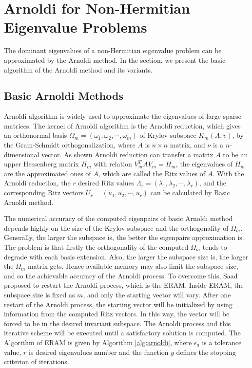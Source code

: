 \section{Arnoldi for Non-Hermitian Eigenvalue Problems}

The dominant eigenvalues of a non-Hermitian eigenvalue problem can be approximated by the Arnoldi method. In the section, we present the basic algorithm of the Arnoldi method and its variants.

\subsection{Basic Arnoldi Methods}
Arnoldi algorithm \cite{arnoldi1951principle} is widely used to approximate the eigenvalues of large sparse matrices. The kernel of Arnoldi algorithm is the Arnoldi reduction, which gives an orthonormal basis \(\Omega_m = (\omega_1,\omega_2,\cdots,\omega_m)\) of Krylov subspace \(K_m(A,v)\), by the Gram-Schmidt orthogonalization, where \(A\) is  \(n \times n\) matrix, and $\nu$ is a \(n\)-dimensional vector. As shown Arnoldi reduction can transfer a matrix \(A\) to be an upper Hessenberg matrix \(H_m\) with relation $V_m^T A V_m = H_m$, the eigenvalues of \(H_m\) are the approximated ones of \(A\), which are called the Ritz values of \(A\). With the Arnoldi reduction, the $r$ desired Ritz values $\Lambda_r=(\lambda_1,\lambda_2,\cdots,\lambda_r)$, and the corresponding Ritz vectors $U_r=(u_1,u_2,\cdots,u_r)$ can be calculated by Basic Arnoldi method.

The numerical accuracy of the computed eigenpairs of basic Arnoldi method depends highly on the size of the Krylov subspace and the orthogonality of $\Omega_m$. Generally, the larger the subspace is, the better the eigenpairs approximation is. The problem is that firstly the orthogonality of the computed $\Omega_m$ tends to degrade with each basis extension. Also, the larger the subspace size is, the larger the $\Omega_m$ matrix gets. Hence available memory may also limit the subspace size, and so the achievable accuracy of the Arnoldi process. To overcome this, Saad \cite{saad2011numerical} proposed to restart the Arnoldi process, which is the ERAM. Inside ERAM, the subspace size is fixed as $m$, and only the starting vector will vary. After one restart of the Arnoldi process, the starting vector will be initialized by using information from the computed Ritz vectors. In this way, the vector will be forced to be in the desired invariant subspace. The Arnoldi process and this iterative scheme will be executed until a satisfactory solution is computed. The Algorithm of ERAM is given by Algorithm \ref{alg:arnoldi}, where $\epsilon_a$ is a tolerance value, $r$ is desired eigenvalues number and the function $g$ defines the stopping criterion of iterations.

